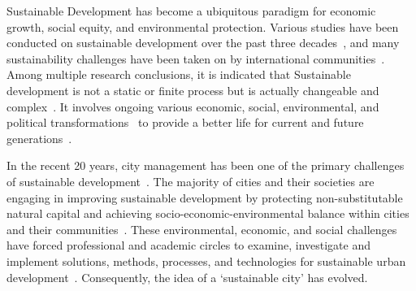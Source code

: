 \documentclass[final,5p,times,twocolumn,authoryear]{elsarticle}
\begin{document}





Sustainable Development has become a ubiquitous paradigm for economic growth, social equity, and environmental protection. Various studies have been conducted on sustainable development over the past three decades~\citep{olawumi2018scientometric, zemigala2019tendencies}, and many sustainability challenges have been taken on by international communities~\citep{un2015, un2016a}. Among multiple research conclusions, it is indicated that Sustainable development is not a static or finite process but is actually changeable and complex~\citep{frini2018making, frini2020temporal, banamar2018extension}. It involves ongoing various economic, social, environmental, and political transformations~\citep{hassan2015paradox} to provide a better life for current and future generations~\citep{wced1987world}.

In the recent 20 years, city management has been one of the primary challenges of sustainable development~\citep{bibri2017ict, bouzguenda2019towards}. The majority of cities and their societies are engaging in improving sustainable development by protecting non-substitutable natural capital and achieving socio-economic-environmental balance within cities and their communities~\citep{heikkinen2019urban}. These environmental, economic, and social challenges have forced professional and academic circles to examine, investigate and implement solutions, methods, processes, and technologies for sustainable urban development~\citep{bouzguenda2019towards}. Consequently, the idea of a ‘sustainable city’ has evolved.
\end{document}
